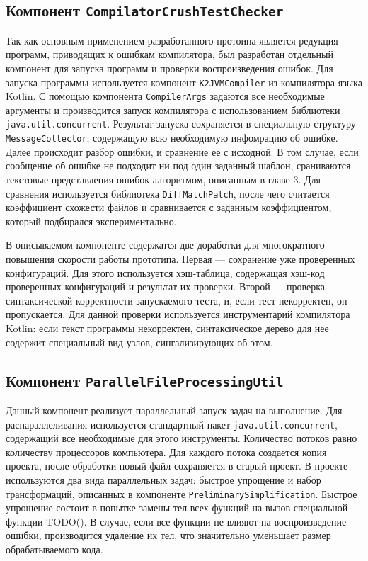 \subsection{Компонент \texttt{CompilatorCrushTestChecker}}
Так как основным применением разработанного протоипа является редукция программ, приводящих к ошибкам компилятора, был разработан отдельный компонент для запуска программ и проверки воспроизведения ошибок. Для запуска программы используется компонент \texttt{K2JVMCompiler} из компилятора языка Kotlin. С помощью компонента \texttt{CompilerArgs} задаются все необходимые аргументы и производится запуск компилятора с использованием библиотеки \texttt{java.util.concurrent}. Результат запуска сохраняется в специальную структуру \texttt{MessageCollector}, содержащую всю необходимую инфомрацию об ошибке. Далее происходит разбор ошибки, и сравнение ее с исходной. В том случае, если сообщение об ошибке не подходит ни под один заданный шаблон, сраниваются текстовые представления ошибок алгоритмом, описанным в главе 3. Для сравнения используется библиотека \texttt{DiffMatchPatch}, после чего считается коэффициент схожести файлов и сравнивается с заданным коэффициентом, который подбирался экспериментально. 

В описываемом компоненте содержатся две доработки для многократного повышения скорости работы прототипа. Первая --- сохранение уже проверенных конфигураций. Для этого используется хэш-таблица, содержащая хэш-код проверенных конфигураций и результат их проверки. Второй --- проверка синтаксической корректности запускаемого теста, и, если тест некорректен, он пропускается. Для данной проверки используется инструментарий компилятора Kotlin: если текст программы некорректен, синтаксическое дерево для нее содержит специальный вид узлов, сингализирующих об этом. 

\subsection{Компонент \texttt{ParallelFileProcessingUtil}}
Данный компонент реализует параллельный запуск задач на выполнение. Для распараллеливания используется стандартный пакет \texttt{java.util.concurrent}, содержащий все необходимые для этого инструменты. Количество потоков равно количеству процессоров компьютера. Для каждого потока создается копия проекта, после обработки новый файл сохраняется в старый проект. В проекте используются два вида параллельных задач: быстрое упрощение и набор трансформаций, описанных в компоненте \texttt{PreliminarySimplification}. Быстрое упрощение состоит в попытке замены тел всех функций на вызов специальной функции TODO(). В случае, если все функции не влияют на воспроизведение ошибки, производится удаление их тел, что значительно уменьшает размер обрабатываемого кода. 

